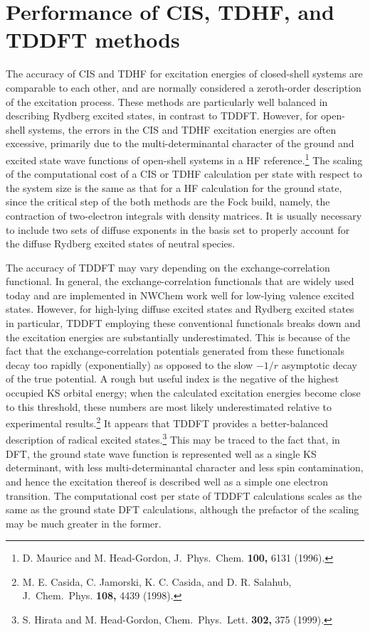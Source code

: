 \section{Performance of CIS, TDHF, and TDDFT methods}

The accuracy of CIS and TDHF for excitation energies of closed-shell systems
are comparable to each other, and are normally considered a zeroth-order
description of the excitation process.  These methods are particularly well balanced
in describing Rydberg excited states, in contrast to TDDFT.
However, for open-shell systems,
the errors in the CIS and TDHF excitation energies are often excessive, primarily
due to the multi-determinantal character of the ground and excited state wave functions
of open-shell systems in a HF reference.\footnote{D. Maurice and M. Head-Gordon, J.\ Phys.\ Chem. {\bf 100,} 6131 (1996).} 
The scaling of the computational cost of a CIS
or TDHF calculation per state with respect to the system size is the same as that for 
a HF calculation for the ground state, since the critical step of the both methods are
the Fock build, namely, the contraction of two-electron integrals with density matrices.
It is usually necessary to include two sets of diffuse exponents in the basis set
to properly account for the diffuse Rydberg excited states of neutral species.

The accuracy of TDDFT may vary depending on the exchange-correlation functional.
In general, the exchange-correlation functionals that are widely used today and are implemented
in NWChem work well for low-lying valence excited states.  However, for high-lying diffuse
excited states and Rydberg excited states in particular, TDDFT employing these 
conventional functionals breaks down and the excitation energies are substantially 
underestimated.  This is because of the fact that the exchange-correlation potentials
generated from these functionals decay too rapidly (exponentially) as opposed to the 
slow $-1/r$ asymptotic decay of the true potential.  A rough but useful index is the 
negative of the highest occupied KS orbital energy; when the calculated excitation energies
become close to this threshold, these numbers are most likely underestimated relative
to experimental results.\footnote{M. E. Casida, C. Jamorski, K. C. Casida, and D. R. Salahub, J.\ Chem.\ Phys. {\bf 108,} 4439 (1998).}  It appears that TDDFT provides a better-balanced description
of radical excited states.\footnote{S. Hirata and M. Head-Gordon, Chem.\ Phys.\ Lett. {\bf 302,} 375 (1999).} 
This may be traced to the fact that, in DFT, the ground state
wave function is represented well as a single KS determinant, with less multi-determinantal
character and less spin contamination, and hence the excitation thereof is described well
as a simple one electron transition.  The computational cost per state of TDDFT calculations 
scales as the same as the ground state DFT calculations, although the prefactor of the scaling
may be much greater in the former.

